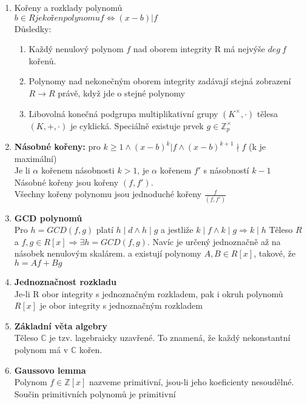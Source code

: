 \documentclass[12pt,a4paper]{article}
\begin{document}
\begin{enumerate}
			\item Kořeny a rozklady polynomů\\
				$b \in R je kořen polynomu f \Leftrightarrow (x-b)|f$\\
				Důsledky:
				\begin{enumerate}
				 	\item Každý nenulový polynom $f$ nad oborem integrity R má nejvýše $deg~f$ kořenů.\\
					\item Polynomy nad nekonečným oborem integrity zadávají stejná zobrazení $R \rightarrow R$ právě, když jde o stejné polynomy
					\item Libovolná konečná podgrupa multiplikativní grupy $(K^{\times},\cdot)$ tělesa $(K,+,\cdot)$ je cyklická. Speciálně existuje prvek $g \in \mathbb{Z}^{\times}_{p}$
				\end{enumerate}
				\item \textbf{Násobné kořeny:} pro $k \geq 1 \land (x-b)^k|f \land (x-b)^{k+1} \nmid f$  (k je maximální)\\
					Je li $\alpha$ kořenem násobnosti $k >1$, je $\alpha$ kořenem $f'$ s násobností $k-1$\\
					Násobné kořeny jsou kořeny $(f,f')$.\\ Všechny kořeny polynomu jsou jednoduché kořeny $\frac{f}{(f,f')}$
				\item \textbf{GCD polynomů}\\
					Pro $h=GCD(f,g)$ platí $h \mid d \land h \mid g$ a jestliže $k \mid f \land k \mid g \Rightarrow k \mid h$
					Těleso $R$ a $f,g \in R[x] \Rightarrow \exists h=GCD(f,g)$. Navíc je určený jednoznačně až na násobek nenulovým skalárem. a existují polynomy $A, B \in R[x]$, takové, že $h=Af+Bg$
				\item \textbf{Jednoznačnost rozkladu}\\
					Je-li R obor integrity s jednoznačným rozkladem, pak i okruh polynomů $R[x]$ je obor integrity s jednoznačným rozkladem
				\item \textbf{Základní věta algebry}\\
					Těleso $\mathbb{C}$ je tzv. lagebraicky uzavřené. To znamená, že každý nekonstantní polynom má v $\mathbb{C}$ kořen.
				\item \textbf{Gaussovo lemma}\\
					Polynom $f \in \mathbb{Z}[x]$ nazveme primitivní, jsou-li jeho koeficienty nesoudělné.\\
					Součin primitivních polynomů je primitivní\\

\end{enumerate}
\end{document}
